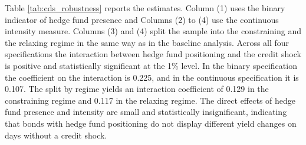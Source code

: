 \documentclass[english, 11pt, oneside]{article}
\begin{document}
Table \ref{tab:cds_robustness} reports the estimates. Column (1) uses the binary indicator of hedge fund presence and Columns (2) to (4) use the continuous intensity measure. Columns (3) and (4) split the sample into the constraining and the relaxing regime in the same way as in the baseline analysis. Across all four specifications the interaction between hedge fund positioning and the credit shock is positive and statistically significant at the 1\% level. In the binary specification the coefficient on the interaction is 0.225, and in the continuous specification it is 0.107. The split by regime yields an interaction coefficient of 0.129 in the constraining regime and 0.117 in the relaxing regime. The direct effects of hedge fund presence and intensity are small and statistically insignificant, indicating that bonds with hedge fund positioning do not display different yield changes on days without a credit shock.
\end{document}
